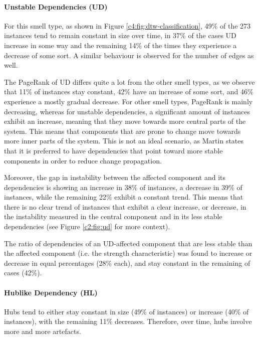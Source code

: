 \paragraph{Unstable Dependencies (UD)} For this smell type, as shown in Figure \ref{c4:fig:dtw-classification}, 49\% of the 273 instances tend to remain constant in size over time, in 37\% of the cases UD increase in some way and the remaining 14\% of the times they experience a decrease of some sort. A similar behaviour is observed for the number of edges as well.

The PageRank of UD differs quite a lot from the other smell types, as we observe that 11\% of instances stay constant, 42\% have an increase of some sort, and 46\% experience a mostly gradual decrease. 
For other smell types, PageRank is mainly decreasing, whereas for unstable dependencies, a significant amount of instances exhibit an increase, meaning that they move towards more central parts of the system.
This means that components that are prone to change move towards more inner parts of the system.
This is not an ideal scenario, as Martin \cite{Martin2018} states that it is preferred to have dependencies that point toward more stable components in order to reduce change propagation.

Moreover, the gap in instability between the affected component and its dependencies is showing an increase in 38\% of instances, a decrease in 39\% of instances, while the remaining 22\% exhibit a constant trend. 
This means that there is no clear trend of instances that exhibit a clear increase, or decrease, in the instability measured in the central component and in its less stable dependencies (see Figure \ref{c2:fig:ud} for more context).

The ratio of dependencies of an UD-affected component that are less stable than the affected component (i.e. the strength characteristic) was found to increase or decrease in equal percentages (28\% each), and stay constant in the remaining of cases (42\%).

\paragraph{Hublike Dependency (HL)} Hubs tend to either stay constant in size (49\% of instances) or increase (40\% of instances), with the remaining 11\% decreases.
Therefore, over time, hubs involve more and more artefacts.

